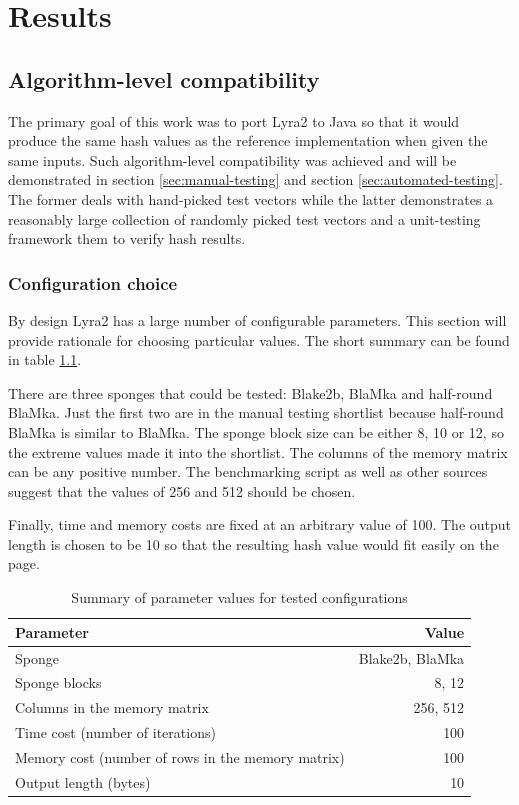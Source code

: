 \chapter{Results}
\label{sec:results}

\section{Algorithm-level compatibility}

The primary goal of this work was to port Lyra2 to Java so that it would produce the same hash values as the reference implementation when given the same inputs. Such algorithm-level compatibility was achieved and will be demonstrated in section \ref{sec:manual-testing} and section \ref{sec:automated-testing}. The former deals with hand-picked test vectors while the latter demonstrates a reasonably large collection of randomly picked test vectors and a unit-testing framework them to verify hash results.

\subsection{Configuration choice}
By design Lyra2 has a large number of configurable parameters. This section will provide rationale for choosing particular values. The short summary can be found in table \ref{table:configuration-summary}.

There are three sponges that could be tested: Blake2b, BlaMka and half-round BlaMka. Just the first two are in the manual testing shortlist because half-round BlaMka is similar to BlaMka. The sponge block size can be either 8, 10 or 12, so the extreme values made it into the shortlist. The columns of the memory matrix can be any positive number. The  benchmarking script as well as other sources suggest that the values of 256 and 512 should be chosen.

Finally, time and memory costs are fixed at an arbitrary value of 100. The output length is chosen to be 10 so that the resulting hash value would fit easily on the page.

\begin{table}
\begin{center}
\begin{tabular}{l r}
Parameter & Value \\ \hline
Sponge & Blake2b, BlaMka \\
Sponge blocks & 8, 12 \\
Columns in the memory matrix & 256, 512 \\
Time cost (number of iterations) & 100 \\
Memory cost (number of rows in the memory matrix) & 100 \\
Output length (bytes) & 10 \\
\end{tabular}
\end{center}
\caption{Summary of parameter values for tested configurations}
\label{table:configuration-summary}
\end{table}

